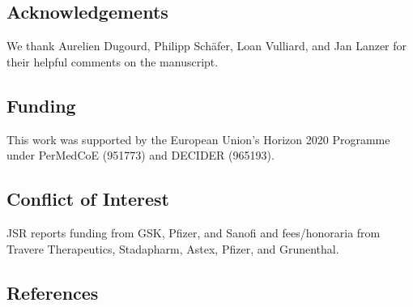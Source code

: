 \hypertarget{acknowledgements}{%
\subsection{Acknowledgements}\label{acknowledgements}}

We thank Aurelien Dugourd, Philipp Schäfer, Loan Vulliard, and Jan Lanzer for their helpful comments on the manuscript.

\hypertarget{funding}{%
\subsection{Funding}\label{funding}}

This work was supported by the European Union's Horizon 2020 Programme under PerMedCoE (951773) and DECIDER (965193).

\hypertarget{conflict-of-interest}{%
\subsection{Conflict of Interest}\label{conflict-of-interest}}

JSR reports funding from GSK, Pfizer, and Sanofi and fees/honoraria from Travere Therapeutics, Stadapharm, Astex, Pfizer, and Grunenthal.

\hypertarget{references}{%
\subsection{References}\label{references}}

